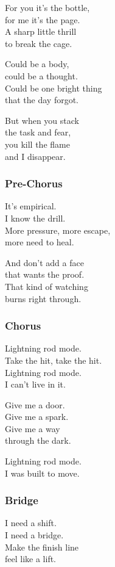 For you it's the bottle,\\
for me it's the page.\\
A sharp little thrill\\
to break the cage.

Could be a body,\\
could be a thought.\\
Could be one bright thing\\
that the day forgot.

But when you stack\\
the task and fear,\\
you kill the flame\\
and I disappear.

\subsubsection{Pre-Chorus}\label{pre-chorus-5}

It's empirical.\\
I know the drill.\\
More pressure, more escape,\\
more need to heal.

And don't add a face\\
that wants the proof.\\
That kind of watching\\
burns right through.

\subsubsection{Chorus}\label{chorus-13}

Lightning rod mode.\\
Take the hit, take the hit.\\
Lightning rod mode.\\
I can't live in it.

Give me a door.\\
Give me a spark.\\
Give me a way\\
through the dark.

Lightning rod mode.\\
I was built to move.

\subsubsection{Bridge}\label{bridge-4}

I need a shift.\\
I need a bridge.\\
Make the finish line\\
feel like a lift.

